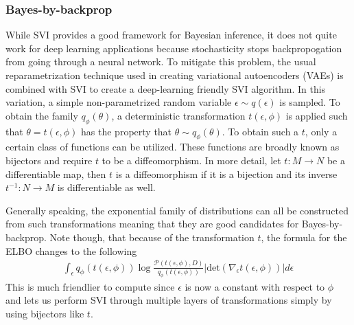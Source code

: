 \subsubsection{Bayes-by-backprop}
\label{sec:bayes-by-backprop}
While SVI provides a good framework for Bayesian inference, it does not quite work for deep learning applications because stochasticity stops backpropogation from going through a neural network. To mitigate this problem, the usual reparametrization technique used in creating variational autoencoders (VAEs) \cite{kingma_introduction_2019} is combined with SVI to create a deep-learning friendly SVI algorithm. In this variation, a simple non-parametrized random variable $\epsilon \sim q(\epsilon)$ is sampled. To obtain the family $q_{\phi}(\theta)$, a deterministic transformation $t(\epsilon, \phi)$ is applied such that $\theta = t(\epsilon, \phi)$ has the property that $\theta \sim q_{\phi}(\theta)$. To obtain such a $t$, only a certain class of functions can be utilized. These functions are broadly known as bijectors and require $t$ to be a diffeomorphism. In more detail, let $t : M \rightarrow N$ be a differentiable map, then $t$ is a diffeomorphism if it is a bijection and its inverse $t^{-1} : N \rightarrow M$ is differentiable as well. 

Generally speaking, the exponential family of distributions can all be constructed from such transformations meaning that they are good candidates for Bayes-by-backprop. Note though, that because of the transformation $t$, the formula for the ELBO changes to the following
\begin{align*}
  \int_{\epsilon} q_{\phi}(t(\epsilon, \phi)) \log \frac{\mathcal{P}(t(\epsilon, \phi), D)}{q_{\phi}(t(\epsilon, \phi))}|\text{det}(\nabla_{\epsilon} t(\epsilon, \phi))| d\epsilon
\end{align*}
This is much friendlier to compute since $\epsilon$ is now a constant with respect to $\phi$ and lets us perform SVI through multiple layers of transformations simply by using bijectors like $t$.


